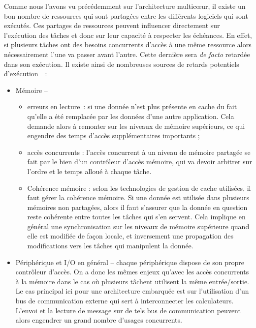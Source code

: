 \documentclass[french, a4paper, 11pt, twoside, pdftex]{StyleThese}
\begin{document}
		Comme nous l'avons vu précédemment sur l'architecture multicœur, il existe un bon nombre de ressources qui sont partagées entre les différents logiciels qui sont exécutés. Ces partages de ressources peuvent influencer directement sur l'exécution des tâches et donc sur leur capacité à respecter les échéances. En effet, si plusieurs tâches ont des besoins concurrents d'accès à une même ressource alors nécessairement l'une va passer avant l'autre. Cette dernière sera \textit{de facto} retardée dans son exécution. Il existe ainsi de nombreuses sources de retards potentiels d'exécution~\cite{kotaba_multicore_2013}~: 
		\begin{itemize}
			\item Mémoire --
			\begin{itemize}[label=$ \circ $] %
				\item 	erreurs en lecture~: si une donnée n'est plus présente en cache du fait qu'elle a été remplacée par les données d'une autre application. Cela demande alors à remonter sur les niveaux de mémoire supérieurs, ce qui engendre des temps d'accès supplémentaires importants ;
				\item 	accès concurrents : l'accès concurrent à un niveau de mémoire partagée se fait par le bien d'un contrôleur d'accès mémoire, qui va devoir arbitrer sur l'ordre et le temps alloué à chaque tâche.
				\item 	Cohérence mémoire : selon les technologies de gestion de cache utilisées, il faut gérer la cohérence mémoire. Si une donnée est utilisée dans plusieurs mémoires non partagées, alors il faut s'assurer que la donnée en question reste cohérente entre toutes les tâches qui s'en servent. Cela implique en général une synchronisation sur les niveaux de mémoire supérieure quand elle est modifiée de façon locale, et inversement une propagation des modifications vers les tâches qui manipulent la donnée.
			\end{itemize}
			\item Périphérique et I/O en général --
				chaque périphérique dispose de son propre contrôleur d'accès. On a donc les mêmes enjeux qu'avec les accès concurrents à la mémoire dans le cas où plusieurs tâchent utilisent la même entrée/sortie. Le cas principal ici pour une architecture embarquée est sur l'utilisation d'un bus de communication externe qui sert à interconnecter les calculateurs. L'envoi et la lecture de message sur de tels bus de communication peuvent alors engendrer un grand nombre d'usages concurrents. 

\end{itemize}
\end{document}
